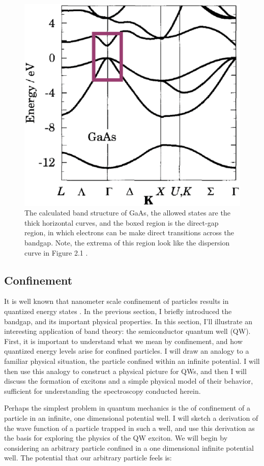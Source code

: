 \begin{figure}[h!]
\centering
\includegraphics[width = .3\textwidth]{GaAsBstruct.eps}
\caption{\doublespacing The calculated band structure of GaAs, the allowed states are the thick horizontal curves, and the boxed region is the direct-gap region, in which electrons can be make direct transitions across the bandgap. Note, the extrema of this region look like the dispersion curve in Figure 2.1 \cite{davies}.}
\label{GaAsBstruct}
\end{figure}


\newpage
\subsection{Confinement}
\indent It is well known that nanometer scale confinement of particles results in quantized energy states \cite{griffiths}. In the previous section, I briefly introduced the bandgap, and its important physical properties. In this section, I'll illustrate an interesting application of band theory: the semiconductor quantum well (QW). First, it is important to understand what we mean by confinement, and how quantized energy levels arise for confined particles. I will draw an analogy to a familiar physical situation, the particle confined within an infinite potential. I will then use this analogy to construct a physical picture for QWs, and then I will discuss the formation of excitons and a simple physical model of their behavior, sufficient for understanding the spectroscopy conducted herein.

\indent Perhaps the simplest problem in quantum mechanics is the of confinement of a particle in an infinite, one dimensional potential well. I will sketch a derivation of the wave function of a particle trapped in such a well, and use this derivation as the basis for exploring the physics of the QW exciton. We will begin by considering an arbitrary particle confined in a one dimensional infinite potential well. The potential that our arbitrary particle feels is:


